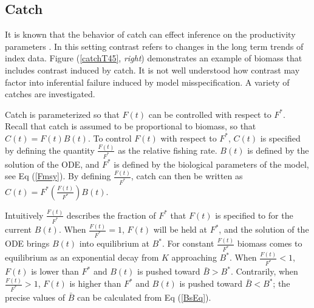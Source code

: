 \documentclass[12pt]{article}
\begin{document}
%
\subsection{Catch \label{catch}}	


%
It is known that the behavior of catch can effect inference on the productivity %
parameters . %
In this setting contrast refers to changes in the long term trends of index data. 
Figure (\ref{catchT45}, \emph{right}) demonstrates an example of biomass 
that includes contrast induced by catch. It 
is not well understood how contrast may factor into inferential failure induced by model %
misspecification. A variety of catches are investigated.

%
Catch is parameterized so that $F(t)$ can be controlled with respect to $F^*$. 
Recall that catch is assumed to be proportional to biomass, so that $C(t)=F(t)B(t)$.
To control $F(t)$ with respect to $F^*$, $C(t)$ is specified by defining the 
quantity $\frac{F(t)}{F^*}$ as the relative fishing rate. $B(t)$ is defined 
by the solution of the ODE, and $F^*$ is defined by the biological parameters 
of the model, see Eq (\ref{Fmsy}). By defining $\frac{F(t)}{F^*}$, catch 
can then be written as \mbox{$C(t)=F^*\left(\frac{F(t)}{F^*}\right)B(t)$.}

%
Intuitively $\frac{F(t)}{F^*}$ describes the fraction of $F^*$ that $F(t)$ is  
specified to for the current $B(t)$. When $\frac{F(t)}{F^*}=1$, $F(t)$ will be 
held at $F^*$, and the solution of the ODE brings $B(t)$ into equilibrium at 
$B^*$. For constant $\frac{F(t)}{F^*}$ biomass %
comes to equilibrium as an exponential decay from $K$ approaching $B^*$. 
When $\frac{F(t)}{F^*}<1$, $F(t)$ is lower than $F^*$ and $B(t)$ is pushed 
toward $\bar B>B^*$. Contrarily, when $\frac{F(t)}{F^*}>1$, $F(t)$ is higher 
than $F^*$ and $B(t)$ is pushed toward $\bar B<B^*$; the precise values of 
$\bar B$ can be calculated from Eq (\ref{BsEq}).
\end{document}
